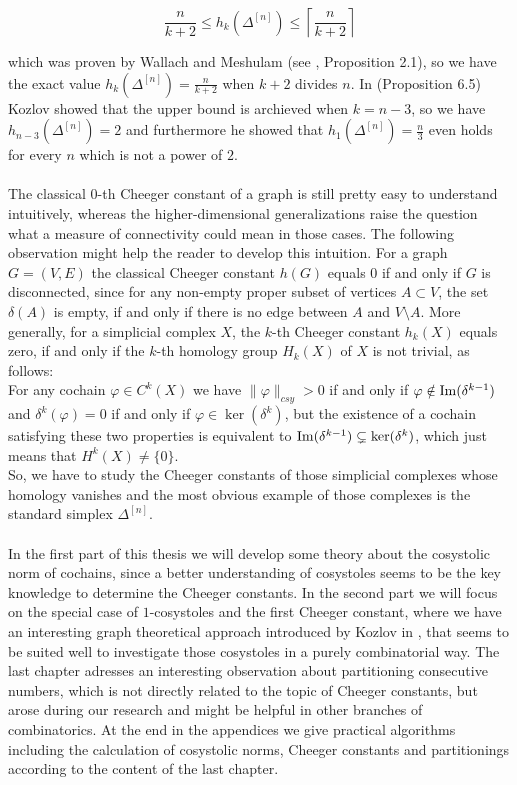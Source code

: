 \begin{equation}\label{equation1}
\frac{n}{k+2}\leq h_k(\Delta^{[n]})\leq\left\lceil\frac{n}{k+2}\right\rceil
\end{equation}

which was proven by Wallach and Meshulam (see \cite{4}, Proposition 2.1), so we have the exact value \(h_k(\Delta^{[n]})=\frac{n}{k+2}\) when \(k+2\) divides \(n\). In \cite{1} (Proposition 6.5) Kozlov showed that the upper bound is archieved when \(k=n-3\), so we have \(h_{n-3}(\Delta^{[n]})=2\) and furthermore he showed that \(h_1(\Delta^{[n]})=\frac{n}{3}\) even holds for every \(n\) which is not a power of \(2\).\\
\\
The classical \(0\)-th Cheeger constant of a graph is still pretty easy to understand intuitively, whereas the higher-dimensional generalizations raise the question what a measure of connectivity could mean in those cases. The following observation might help the reader to develop this intuition. For a graph \(G=(V,E)\) the classical Cheeger constant \(h(G)\) equals \(0\) if and only if \(G\) is disconnected, since for any non-empty proper subset of vertices \(A\subset V\), the set \(\delta(A)\) is empty, if and only if there is no edge between \(A\) and \(V\setminus A\). More generally, for a simplicial complex \(X\), the \(k\)-th Cheeger constant \(h_k(X)\) equals zero, if and only if the \(k\)-th homology group \(H_k(X)\) of \(X\) is not trivial, as follows:\\
For any cochain \(\varphi\in C^k(X)\) we have \(\|\varphi\|_{csy}>0\) if and only if \(\varphi\notin\mathrm{Im}(\delta^{k-1})\) and \(\delta^k(\varphi)=0\) if and only if \(\varphi\in\ker(\delta^k)\), but the existence of a cochain satisfying these two properties is equivalent to \(\mathrm{Im}(\delta^{k-1})\subsetneq\ker(\delta^k)\), which just means that \(H^k(X)\neq\{0\}\).\\
So, we have to study the Cheeger constants of those simplicial complexes whose homology vanishes and the most obvious example of those complexes is the standard simplex \(\Delta^{[n]}\).\\
\\
In the first part of this thesis we will develop some theory about the cosystolic norm of cochains, since a better understanding of cosystoles seems to be the key knowledge to determine the Cheeger constants. In the second part we will focus on the special case of \(1\)-cosystoles and the first Cheeger constant, where we have an interesting graph theoretical approach introduced by Kozlov in \cite{1}, that seems to be suited well to investigate those cosystoles in a purely combinatorial way. The last chapter adresses an interesting observation about partitioning consecutive numbers, which is not directly related to the topic of Cheeger constants, but arose during our research and might be helpful in other branches of combinatorics. At the end in the appendices we give practical algorithms including the calculation of cosystolic norms, Cheeger constants and partitionings according to the content of the last chapter.

